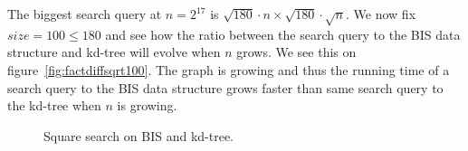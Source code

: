 The biggest search query at $n = 2^{17}$ is $\sqrt{180}\cdot{n} \times \sqrt{180}\cdot\sqrt{n}$. We now fix $size = 100 \leq 180$ and see how the ratio between the search query to the BIS data structure and kd-tree will evolve when $n$ grows. We see this on figure~\ref{fig:factdiffsqrt100}. The graph is growing and thus the running time of a search query to the BIS data structure grows faster than same search query to the kd-tree when $n$ is growing.

\begin{figure}[h]
    \caption{Square search on BIS and kd-tree.}
    \label{fig:sqrt_17_25}
  
\end{figure}

